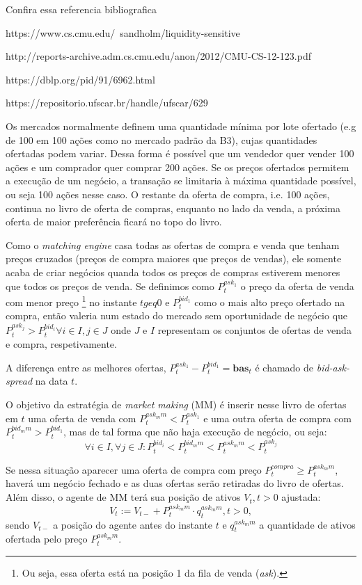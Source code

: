 Confira essa referencia bibliografica

https://www.cs.cmu.edu/~sandholm/liquidity-sensitive%

http://reports-archive.adm.cs.cmu.edu/anon/2012/CMU-CS-12-123.pdf

https://dblp.org/pid/91/6962.html


https://repositorio.ufscar.br/handle/ufscar/629

Os mercados normalmente definem uma quantidade mínima por lote ofertado (e.g de 100 em 100 ações como no mercado padrão da B3), cujas quantidades ofertadas podem variar. Dessa forma é possível que um vendedor quer vender 100 ações e um comprador quer comprar 200 ações. Se os preços ofertados permitem a execução de um negócio, a transação se limitaria à máxima quantidade possível, ou seja 100 ações nesse caso. O restante da oferta de compra, i.e. 100 ações, continua no livro de oferta de compras, enquanto no lado da venda, a próxima oferta de maior preferência ficará no topo do livro.

Como o \textit{matching engine} casa todas as ofertas de compra e venda que tenham preços cruzados (preços de compra maiores que preços de vendas), ele somente acaba de criar negócios quanda todos os preços de compras estiverem menores que todos os preços de venda. 
Se definimos como $P_t^{ask_1}$ o preço da oferta de venda com menor preço \footnote{Ou seja, essa oferta está na posição 1 da fila de venda (\textit{ask}).} no instante $t geq 0$ e $P_t^{bid_1}$ como o mais alto preço ofertado na compra, então valeria num estado do mercado sem oportunidade de negócio que $P_t^{ask_j} > P_t^{bid_i} \forall i \in I, j \in J$ onde $J$ e $I$ representam os conjuntos de ofertas de venda e compra, respetivamente.

A diferença entre as melhores ofertas, $P_t^{ask_1} - P_t^{bid_1} = \mathbf{bas}_t$ é chamado de \textit{bid-ask-spread} na data $t$.

O objetivo da estratégia de \textit{market making} (MM) é inserir nesse livro de ofertas em $t$ uma oferta de venda com $P_t^{ask_mm} < P_t^{ask_1}$ e uma outra oferta de compra com $P_t^{bid_mm} > P_t^{bid_1}$, mas de tal forma que não haja execução de negócio, ou seja:
\begin{equation*}
    \forall{i \in I}, \forall{j \in J}:  P_t^{bid_i} < P_t^{bid_mm} < P_t^{ask_mm} < P_t^{ask_j}
\end{equation*}
    
Se nessa situação aparecer uma oferta de compra com preço $P_t^{compra} \geq P_t^{ask_mm}$, haverá um negócio fechado e as duas ofertas serão retiradas do livro de ofertas. Além disso, o agente de MM terá sua posição de ativos $V_t, t> 0$ ajustada:
\begin{equation*}
    V_t:= V_{t-} + P_t^{ask_mm}\cdot q_t^{ask_mm}, t > 0,
\end{equation*}
sendo $V_{t-}$ a posição do agente antes do instante $t$ e $q_t^{ask_mm}$ a quantidade de ativos ofertada pelo preço $P_t^{ask_mm}$.

